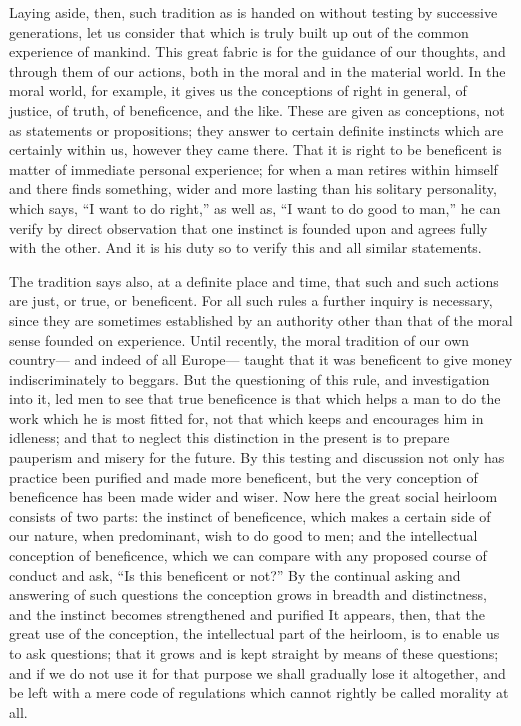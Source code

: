 \documentclass[12pt]{article}
\begin{document}
Laying aside, then, such tradition as is handed on without testing by successive generations, let us consider that which is truly built up out of the common experience of mankind. This great fabric is for the guidance of our thoughts, and through them of our actions, both in the moral and in the material world. In the moral world, for example, it gives us the conceptions of right in general, of justice, of truth, of beneficence, and the like. These are given as conceptions, not as statements or propositions; they answer to certain definite instincts which are certainly within us, however they came there. That it is right to be beneficent is matter of immediate personal experience; for when a man retires within himself and there finds something, wider and more lasting than his solitary personality, which says, ``I want to do right,'' as well as, ``I want to do good to man,'' he can verify by direct observation that one instinct is founded upon and agrees fully with the other. And it is his duty so to verify this and all similar statements.

The tradition says also, at a definite place and time, that such and such actions are just, or true, or beneficent. For all such rules a further inquiry is necessary, since they are sometimes established by an authority other than that of the moral sense founded on experience. Until recently, the moral tradition of our own country--- and indeed of all Europe--- taught that it was beneficent to give money indiscriminately to beggars. But the questioning of this rule, and investigation into it, led men to see that true beneficence is that which helps a man to do the work which he is most fitted for, not that which keeps and encourages him in idleness; and that to neglect this distinction in the present is to prepare pauperism and misery for the future. By this testing and discussion not only has practice been purified and made more beneficent, but the very conception of beneficence has been made wider and wiser. Now here the great social heirloom consists of two parts: the instinct of beneficence, which makes a certain side of our nature, when predominant, wish to do good to men; and the intellectual conception of beneficence, which we can compare with any proposed course of conduct and ask, ``Is this beneficent or not?'' By the continual asking and answering of such questions the conception grows in breadth and distinctness, and the instinct becomes strengthened and purified It appears, then, that the great use of the conception, the intellectual part of the heirloom, is to enable us to ask questions; that it grows and is kept straight by means of these questions; and if we do not use it for that purpose we shall gradually lose it altogether, and be left with a mere code of regulations which cannot rightly be called morality at all.
\end{document}
